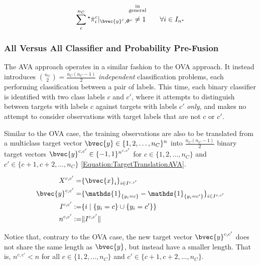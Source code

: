 				\begin{equation}
					\sum_{c}^{n_{C}} {^{\star}}\bar{\pi}^{c}_{i} |_{\bvec{y}^{c}, \vec{\uptheta}^{c}} \stackrel{\mathclap{\substack{\text{in} \\ \text{general} \\ \quad }}}{\neq} 1 \qquad \forall i \in I_{n^{\star}}
				\label{Equation:ProbabilityInconsistencyOVA}
				\end{equation}
				
			\subsubsection{All Versus All Classifier and Probability Pre-Fusion}
			\label{BenthicHabitatMapping:Classification:MulticlassClassification:AVA}
			
				The AVA approach operates in a similar fashion to the OVA approach. It instead introduces ${n_{C} \choose 2} = \frac{n_{C} (n_{C} - 1)}{2}$ \textit{independent} classification problems, each performing classification between a pair of labels. This time, each binary classifier is identified with two class labels $c$ and $c'$, where it attempts to distinguish between targets with labels $c$ against targets with labels $c'$ \textit{only}, and makes no attempt to consider observations with target labels that are not $c$ or $c'$. 
				
				Similar to the OVA case, the training observations are also to be translated from a multiclass target vector $\bvec{y} \in \{1, 2, \dots, n_{C}\}^{n}$ into $\frac{n_{C} (n_{C} - 1)}{2}$ binary target vectors $\bvec{y}^{c, c'} \in \{-1, 1\}^{n^{c, c'}}$ for $c \in \{1, 2, \dots, n_{C}\}$ and $c' \in \{c + 1, c + 2, \dots, n_{C}\}$ \eqref{Equation:TargetTranslationAVA}.
								
				\begin{equation}
					\begin{aligned}
						X^{c, c'} =& \{\bvec{x}_{i}\}_{i \in I^{c, c'}} \\
						\bvec{y}^{c, c'} =& \{\mathds{1}_{\{y_{i} = c\}} - \mathds{1}_{\{y_{i} = c'\}}\}_{i \in I^{c, c'}} \\
						I^{c, c'} :=& \{i \; | \; \{y_{i} = c\} \cup \{y_{i} = c'\} \} \\
						n^{c, c'} :=& \Vert I^{c, c'} \Vert
					\end{aligned}
				\label{Equation:TargetTranslationAVA}
				\end{equation}				
				
				Notice that, contrary to the OVA case, the new target vector $\bvec{y}^{c, c'}$ does not share the same length as $\bvec{y}$, but instead have a smaller length. That is, $n^{c, c'} < n$ for all $c \in \{1, 2, \dots, n_{C}\}$ and $c' \in \{c + 1, c + 2, \dots, n_{C}\}$.
				
